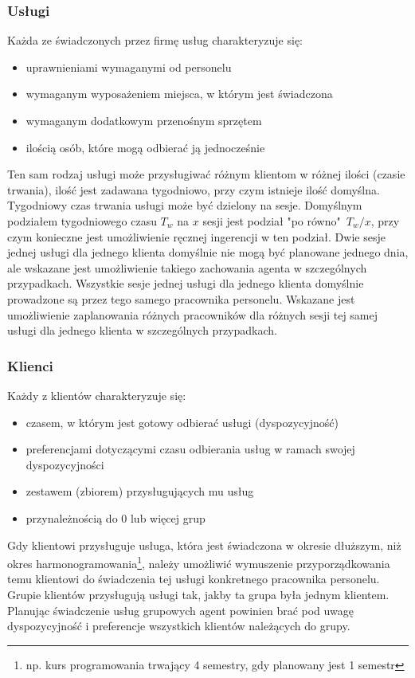 \subsubsection{Usługi}\label{sssec:uslugi}
Każda ze świadczonych przez firmę usług charakteryzuje się:
\begin{itemize}
	\item{uprawnieniami wymaganymi od personelu}
	\item{wymaganym wyposażeniem miejsca, w którym jest świadczona}
	\item{wymaganym dodatkowym przenośnym sprzętem}
	\item{ilością osób, które mogą odbierać ją jednocześnie}
\end{itemize}
Ten sam rodzaj usługi może przysługiwać różnym klientom w różnej ilości (czasie trwania), ilość jest zadawana tygodniowo, przy czym istnieje ilość domyślna.
Tygodniowy czas trwania usługi może być dzielony na sesje. Domyślnym podziałem tygodniowego czasu \( T_w \) na \( x \) sesji jest podział "po równo"\ \( T_w/x \), przy czym konieczne jest umożliwienie ręcznej ingerencji w ten podział.
Dwie sesje jednej usługi dla jednego klienta domyślnie nie mogą być planowane jednego dnia, ale wskazane jest umożliwienie takiego zachowania agenta w szczególnych przypadkach.
Wszystkie sesje jednej usługi dla jednego klienta domyślnie prowadzone są przez tego samego pracownika personelu. Wskazane jest umożliwienie zaplanowania różnych pracowników dla różnych sesji tej samej usługi dla jednego klienta w szczególnych przypadkach.

\subsubsection{Klienci}\label{sssec:klienci}
Każdy z klientów charakteryzuje się:
\begin{itemize}
	\item{czasem, w którym jest gotowy odbierać usługi (dyspozycyjność)}
	\item{preferencjami dotyczącymi czasu odbierania usług w ramach swojej dyspozycyjności}
	\item{zestawem (zbiorem) przysługujących mu usług}
	\item{przynależnością do 0 lub więcej grup}
\end{itemize}
Gdy klientowi przysługuje usługa, która jest świadczona w okresie dłuższym, niż okres harmonogramowania\footnote{np. kurs programowania trwający 4 semestry, gdy planowany jest 1 semestr}, należy umożliwić wymuszenie przyporządkowania temu klientowi do świadczenia tej usługi konkretnego pracownika personelu. 
Grupie klientów przysługują usługi tak, jakby ta grupa była jednym klientem. Planując świadczenie usług grupowych agent powinien brać pod uwagę dyspozycyjność i preferencje wszystkich klientów należących do grupy.

